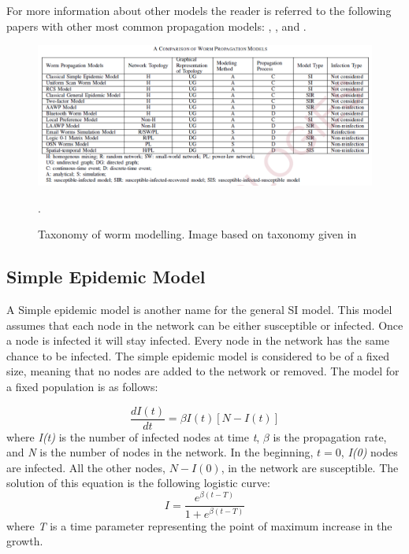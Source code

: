 For more information about other models the reader is referred to the following papers with other most common propagation models: \cite{wang2014modeling}, \cite{OnWorms2005survey}, \cite{xiang2009propagation} and \cite{serazzi2004computer}.



\begin{figure}
\centering
\includegraphics[scale=0.55]{Images/tableworms.png}
\caption{Taxonomy of worm modelling. Image based on taxonomy given in \cite{wang2014modeling}}.
\label{tree}
\end{figure}


\subsection{Simple Epidemic Model}
A Simple epidemic model is another name for the general SI model. This model assumes that each node in the network can be either susceptible or infected. 
Once a node is infected it will stay infected. Every node in the network has the same chance to be infected. 
The simple epidemic model is considered to be of a fixed size, meaning that no nodes are added to the network or removed. The model for a fixed population is as follows:

\begin{equation}
\dfrac{d I(t)}{dt} = \beta I(t)[N-I(t)]
\end{equation} 
where \textit{I(t)} is the number of infected nodes at time \textit{t}, $\beta$ is the propagation rate, and \textit{N} is the number of nodes in the network. In the beginning, $t=0$, \textit{I(0)} nodes are infected. All the other nodes, $N - I(0)$, in the network are susceptible. 
The solution of this equation is the following logistic curve:
\begin{equation}
I = \dfrac{e^{\beta(t-T)}}{1+e^{\beta(t-T)}}
\label{SIdelay}
\end{equation}
where \textit{T} is a time parameter representing the point of maximum increase in the growth.\\


